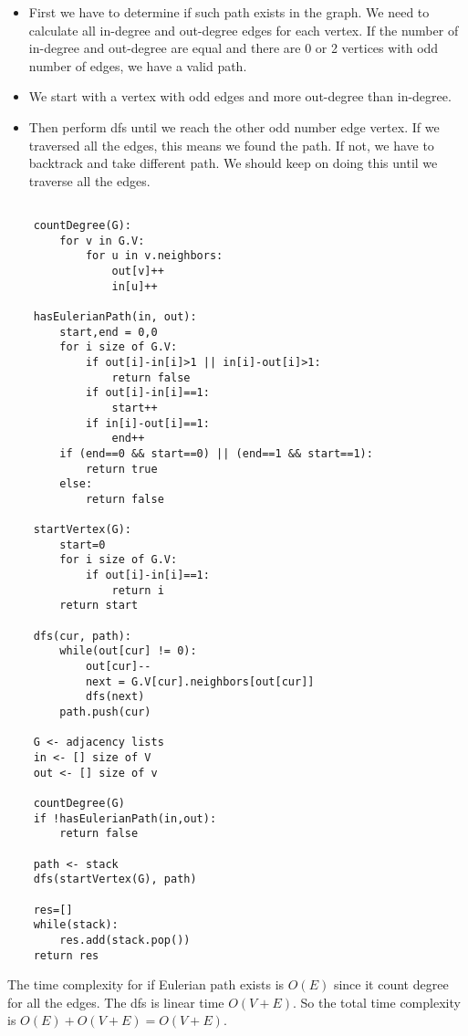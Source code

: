 \documentclass{article}
\begin{document}
\begin{enumerate}
  \begin{itemize}
    \item First we have to determine if such path exists in the graph.
    We need to calculate all in-degree and out-degree edges for each vertex.
    If the number of in-degree and out-degree are equal and there are 0 or 2 vertices with odd number of edges, we have a valid path.
    \item We start with a vertex with odd edges and more out-degree than in-degree.
    \item Then perform dfs until we reach the other odd number edge vertex.
    If we traversed all the edges, this means we found the path.
    If not, we have to backtrack and take different path.
    We should keep on doing this until we traverse all the edges.
  \end{itemize}

  \begin{lstlisting}

    countDegree(G):
        for v in G.V:
            for u in v.neighbors:
                out[v]++
                in[u]++
    
    hasEulerianPath(in, out):
        start,end = 0,0
        for i size of G.V:
            if out[i]-in[i]>1 || in[i]-out[i]>1:
                return false
            if out[i]-in[i]==1:
                start++
            if in[i]-out[i]==1:
                end++
        if (end==0 && start==0) || (end==1 && start==1):
            return true
        else:
            return false
    
    startVertex(G):
        start=0
        for i size of G.V:
            if out[i]-in[i]==1:
                return i
        return start

    dfs(cur, path):
        while(out[cur] != 0):
            out[cur]--
            next = G.V[cur].neighbors[out[cur]]
            dfs(next)
        path.push(cur)
        
    G <- adjacency lists
    in <- [] size of V
    out <- [] size of v

    countDegree(G)
    if !hasEulerianPath(in,out):
        return false
    
    path <- stack
    dfs(startVertex(G), path)

    res=[]
    while(stack):
        res.add(stack.pop())
    return res
  \end{lstlisting}

  The time complexity for if Eulerian path exists is $O(E)$ since it count degree for all the edges.
  The dfs is linear time $O(V+E)$.
  So the total time complexity is $O(E)+O(V+E)=O(V+E)$.


\end{enumerate}
\end{document}
